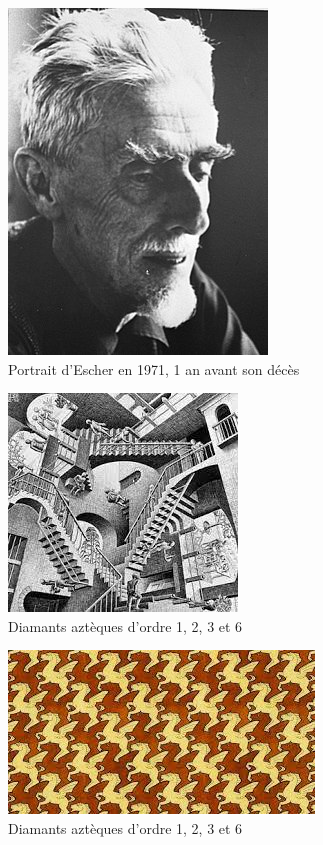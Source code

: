 \documentclass{article}
\begin{document}
\begin{figure} [!h]
    \center
    \includegraphics [scale=0.5] {image/escher.jpg}
    \caption{Portrait d'Escher en 1971, 1 an avant son décès}
\end{figure}

\begin{figure} [!h]
    \center
    \includegraphics [scale=0.5] {image/dessin1_escherjpg.jpg}
    \caption{Diamants aztèques d'ordre 1, 2, 3 et 6}
\end{figure}

\begin{figure} [!h]
    \center
    \includegraphics [scale=0.5] {image/dessin2_escherjpg.jpg}
    \caption{Diamants aztèques d'ordre 1, 2, 3 et 6}
\end{figure}
\end{document}
